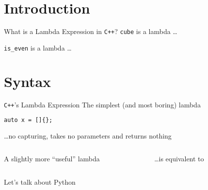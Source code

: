 \begin{frame}
    \centering
    \scalebox{3}{Introduction}
\end{frame}

\section{Introduction}

\begin{frame}[fragile]{What is a Lambda Expression in \texttt{C++}?}
    \texttt{cube} is a lambda \ldots

    \texttt{is\_even} is a lambda \ldots
\end{frame}

\begin{frame}
    \centering
    \scalebox{3}{Syntax}
\end{frame}

\section{Syntax}

\begin{frame}[fragile]{\texttt{C++}'s Lambda Expression}
    The simplest (and most boring) lambda
    \begin{lstlisting}
auto x = []{};
    \end{lstlisting}
    \hfill \ldots no capturing, takes no parameters and returns nothing

    \vspace{5mm}

    \begin{columns}[t]
        \begin{column}{.45\textwidth}
            A slightly more \enquote{useful} lambda
        \end{column}
        \begin{column}{.45\textwidth}
            \ldots is equivalent to
        \end{column}
    \end{columns}
\end{frame}

\begin{frame}{Let's talk about Python}
    \centering
\end{frame}

